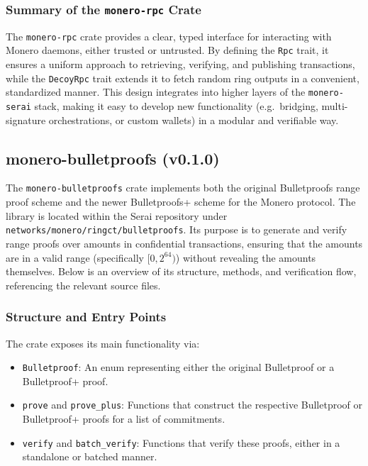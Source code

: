 \subsubsection{Summary of the \texttt{monero-rpc} Crate}
\label{sec:monero-rpc-conclusion}

The \texttt{monero-rpc} crate provides a clear, typed interface for interacting
with Monero daemons, either trusted or untrusted.  By defining the \texttt{Rpc}
trait, it ensures a uniform approach to retrieving, verifying, and publishing
transactions, while the \texttt{DecoyRpc} trait extends it to fetch random ring
outputs in a convenient, standardized manner.  This design integrates into
higher layers of the \texttt{monero-serai} stack, making it easy to develop new
functionality (e.g.\ bridging, multi-signature orchestrations, or custom
wallets) in a modular and verifiable way.


\subsection{monero-bulletproofs (v0.1.0)}
\label{sec:monero-bulletproofs-impl}

The \texttt{monero-bulletproofs} crate implements both the original Bulletproofs range proof scheme and the newer Bulletproofs+ scheme for the Monero protocol.  The library is located within the Serai repository under \texttt{\small networks/monero/ringct/bulletproofs}.  Its purpose is to generate and verify range proofs over amounts in confidential transactions, ensuring that the amounts are in a valid range (specifically $[0, 2^{64})$) without revealing the amounts themselves.  Below is an overview of its structure, methods, and verification flow, referencing the relevant source files.

\subsubsection{Structure and Entry Points}
The crate exposes its main functionality via:
\begin{itemize}
    \item \texttt{Bulletproof}: An enum representing either the original Bulletproof or a Bulletproof+ proof. %
    \item \texttt{prove} and \texttt{prove\_plus}: Functions that construct the respective Bulletproof or Bulletproof+ proofs for a list of commitments. %
    \item \texttt{verify} and \texttt{batch\_verify}: Functions that verify these proofs, either in a standalone or batched manner. %
\end{itemize}

